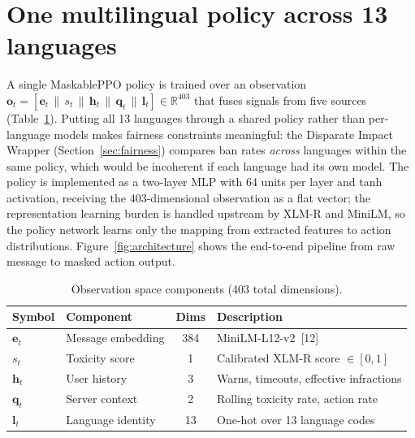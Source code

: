 \documentclass{article}
\begin{document}
\section{One multilingual policy across 13 languages}
\label{sec:architecture}

A single MaskablePPO policy is trained over an observation
$\mathbf{o}_t = [\mathbf{e}_t \,\|\, s_t \,\|\, \mathbf{h}_t \,\|\, \mathbf{q}_t \,\|\, \mathbf{l}_t]
\in \mathbb{R}^{403}$ that fuses signals from five sources
(Table~\ref{tab:obs_space}). Putting all 13 languages through a shared policy
rather than per-language models makes fairness constraints meaningful: the
Disparate Impact Wrapper (Section~\ref{sec:fairness}) compares ban rates
\emph{across} languages within the same policy, which would be incoherent if each
language had its own model. The policy is implemented as a two-layer MLP with 64
units per layer and tanh activation, receiving the 403-dimensional observation as
a flat vector; the representation learning burden is handled upstream by XLM-R
and MiniLM, so the policy network learns only the mapping from extracted features
to action distributions. Figure~\ref{fig:architecture} shows the end-to-end
pipeline from raw message to masked action output.

\begin{table}[t]
  \caption{Observation space components (403 total dimensions).}
  \label{tab:obs_space}
  \centering
  \begin{tabular}{llcl}
    \toprule
    Symbol & Component & Dims & Description \\
    \midrule
    $\mathbf{e}_t$ & Message embedding   & 384 & MiniLM-L12-v2~[12] \\
    $s_t$          & Toxicity score      & 1   & Calibrated XLM-R score $\in[0,1]$ \\
    $\mathbf{h}_t$ & User history        & 3   & Warns, timeouts, effective infractions \\
    $\mathbf{q}_t$ & Server context      & 2   & Rolling toxicity rate, action rate \\
    $\mathbf{l}_t$ & Language identity   & 13  & One-hot over 13 language codes \\
    \bottomrule
  \end{tabular}
\end{table}
\end{document}
